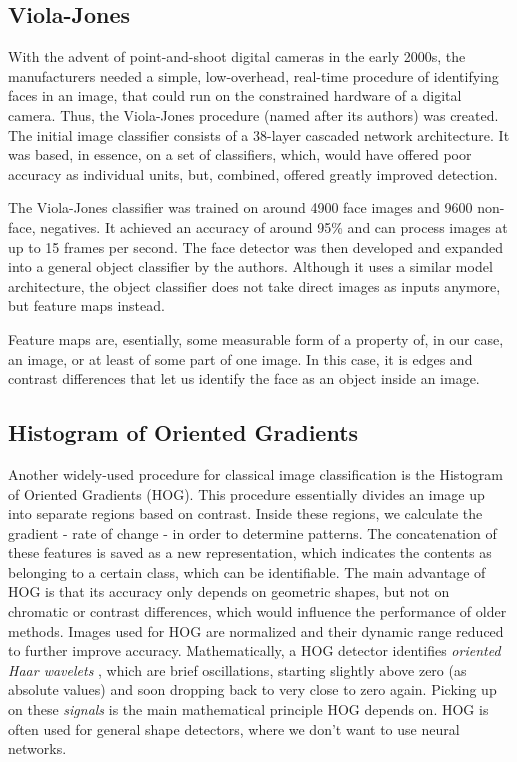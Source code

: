 \subsection{Viola-Jones}
With the advent of point-and-shoot digital cameras in the early 2000s, the manufacturers needed a simple, low-overhead, real-time procedure of identifying faces in an image, that could run on the constrained hardware of a digital camera. Thus, the Viola-Jones procedure (named after its authors) was created. The initial image classifier consists of a 38-layer cascaded network architecture. It was based, in essence, on a set of classifiers, which, would have offered poor accuracy as individual units, but, combined, offered greatly improved detection. \par 
The Viola-Jones classifier was trained on around 4900 face images and 9600 non-face, negatives. It achieved an accuracy of around 95\% and can process images at up to 15 frames per second. \cite{viola_jones_1} The face detector was then developed and expanded into a general object classifier by the authors. Although it uses a similar model architecture, the object classifier does not take direct images as inputs anymore, but feature maps instead. \cite{viola_jones_2} \par
Feature maps are, esentially, some measurable form of a property of, in our case, an image, or at least of some part of one image. \cite{pat_rec_springer} In this case, it is edges and contrast differences that let us identify the face as an object inside an image. 
\subsection{Histogram of Oriented Gradients}
Another widely-used procedure for classical image classification is the Histogram of Oriented Gradients (HOG). This procedure essentially divides an image up into separate regions based on contrast. Inside these regions, we calculate the gradient - rate of change - in order to determine patterns. The concatenation of these features is saved as a new representation, which indicates the contents as belonging to a certain class, which can be identifiable. The main advantage of HOG is that its accuracy only depends on geometric shapes, but not on chromatic or contrast differences, which would influence the performance of older methods. Images used for HOG are normalized and their dynamic range reduced to further improve accuracy. \cite{HOG_humans} Mathematically, a HOG detector identifies \textit{oriented Haar wavelets} \cite{haar_1910}, which are brief oscillations, starting slightly above zero (as absolute values) and soon dropping back to very close to zero again. Picking up on these \textit{signals} is the main mathematical principle HOG depends on. HOG is often used for general shape detectors, where we don't want to use neural networks.
